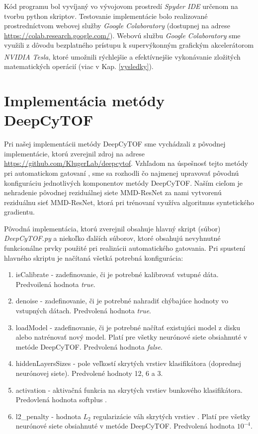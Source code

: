 Kód programu bol vyvíjaný vo vývojovom prostredí \textit{Spyder IDE} určenom na tvorbu python skriptov. Testovanie implementácie bolo realizované prostredníctvom webovej služby \textit{Google Colaboratory} (dostupnej na adrese \url{https://colab.research.google.com/}). Webovú službu \textit{Google Colaboratory} sme využili z dôvodu bezplatného prístupu k supervýkonným grafickým akcelerátorom \textit{NVIDIA\textsuperscript{\textregistered} Tesla}, ktoré umožnili rýchlejšie a efektívnejšie vykonávanie zložitých matematických operácií (viac v Kap. \ref{vysledky}). 

\section{Implementácia metódy DeepCyTOF}
\label{impl_deepcytof}

Pri našej implementácii metódy DeepCyTOF sme vychádzali z pôvodnej implementácie, ktorú zverejnil zdroj \cite{Li2017} na adrese \url{https://github.com/KlugerLab/deepcytof}. Vzhľadom na úspešnosť tejto metódy pri automatickom gatovaní \cite{Li2016, Li2017}, sme sa rozhodli čo najmenej upravovať pôvodnú konfiguráciu jednotlivých komponentov metódy DeepCyTOF. Naším cieľom je nehradenie pôvodnej reziduálnej siete MMD-ResNet za nami vytvorenú reziduálnu sieť MMD-ResNet, ktorá pri trénovaní využíva algoritmus syntetického gradientu.

Pôvodná implementácia, ktorú zverejnil \cite{Li2017} obsahuje hlavný skript (súbor) \textit{DeepCyTOF.py} a niekoľko ďalších súborov, ktoré obsahujú nevyhnutné funkcionálne prvky použité pri realizácii automatického gatovania. Pri spustení hlavného skriptu je načítaná všetká potrebná konfigurácia:
\begin{enumerate}
    \item isCalibrate - zadefinovanie, či je potrebné kalibrovať vstupné dáta. Predvoilená hodnota \textit{true}.
    \item denoise - zadefinovanie, či je potrebné nahradiť chýbajúce hodnoty vo vstupných dátach. Predvolená hodnota \textit{true}.
    \item loadModel - zadefinovanie, či je potrebné načítať existujúci model z disku alebo natrénovať nový model. Platí pre všetky neurónové siete obsiahnuté v metóde DeepCyTOF. Predvolená hodnota \textit{false}.
    \item hiddenLayersSizes - pole veľkostí skrytých vrstiev klasifikátora (doprednej neurónovej siete). Predvolené hodnoty 12, 6 a 3.
    \item activation - aktivačná funkcia na skrytých vrstiev bunkového klasifikátora. Predovlená hodnota softplus \cite{Goh1995}.
    \item l2\_penalty - hodnota \textit{$L_2$} regularizácie váh skrytých vrstiev \cite{Goh1995}. Platí pre všetky neurónové siete obsiahnuté v metóde DeepCyTOF. Predvolená hodnota $10^{-4}$.
\end{enumerate}

